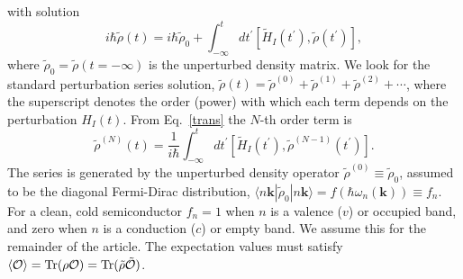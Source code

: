 \documentclass[floatfix,prb,aps,superscriptaddress,11pt,preprint,letterpaper]{revtex4}
\def\chon{black}
\begin{document}
with solution 
\begin{equation}
i\hbar \tilde{{\rho}}(t)=i\hbar \tilde{{\rho}}_{0}+\int_{-\infty }^{t}dt^{\prime }[
\tilde{H}_{I}(t^{\prime }),\tilde{\rho}(t^{\prime })],  
\label{trans}
\end{equation}
where $\tilde{\rho}_{0}=\tilde{\rho}(t=-\infty )$ is the unperturbed density matrix. We look
for the standard perturbation series solution, 
$\tilde{\rho}(t)=\tilde{\rho}^{(0)}+\tilde{\rho}^{(1)}+\tilde{\rho}^{(2)}+\cdots$,  
where the superscript denotes the order (power) with which each term depends
on the perturbation $H_{I}(t)$. From Eq.~\eqref{trans} the $N$-th order
term is 
\begin{equation}
\tilde{{\rho}}^{(N)}(t)=\frac{1}{i\hbar }\int_{-\infty }^{t}dt^{\prime }[\tilde{
H}_{I}(t^{\prime }),\tilde{\rho}^{(N-1)}(t^{\prime })].  
\label{rhop}
\end{equation}
The series is generated by the unperturbed density operator $\tilde{\rho}
^{(0)}\equiv \tilde{\rho}_{0}$, assumed to be the diagonal Fermi-Dirac distribution, 
$\langle n\mathbf{k}|\tilde{\rho}_{0}|n\mathbf{k}\rangle=f(\hbar \omega_{n}(\mathbf{k}))\equiv f_{n}$. For a
clean, cold semiconductor $f_{n}=1$ {\color{\chon} when} $n$ {\color{\chon} is} a valence ($v$) or
occupied band, and zero {\color{\chon} when} $n$ {\color{\chon} is} a conduction ($c$) or empty band.
{\color{\chon} We assume this for the remainder of the article.}
{\color{\chon} T}he expectation values must satisfy
$
\langle{\cal O}\rangle=
\mbox{Tr}({\rho}{\cal O})
=
\mbox{Tr}(\tilde{{\rho}}\tilde{\cal O})
$.  
\end{document}
